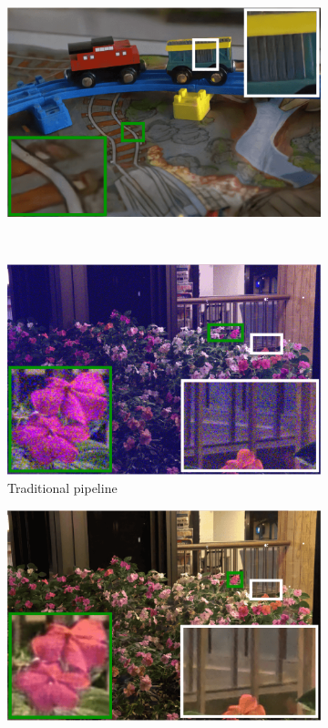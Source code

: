 \documentclass[letterpaper,12pt]{article}
\begin{document}
\begin{figure}[htbp]
\begin{subfigure}{0.3\textwidth}
				\includegraphics[width=\linewidth]{qualitative_comparison/f}
				\label{fig: qualitative_comparison_f}  
			\end{subfigure}\\    
			\begin{subfigure}{0.3\textwidth}
				\includegraphics[width=\linewidth]{qualitative_comparison/g}
				\captionsetup{font=scriptsize}
				\caption{Traditional pipeline}
				\label{fig:qualitative_comparison_g}
			\end{subfigure}
			\begin{subfigure}{0.3\textwidth}
				\includegraphics[width=\linewidth]{qualitative_comparison/h}

\end{subfigure}
\end{figure}
\end{document}
